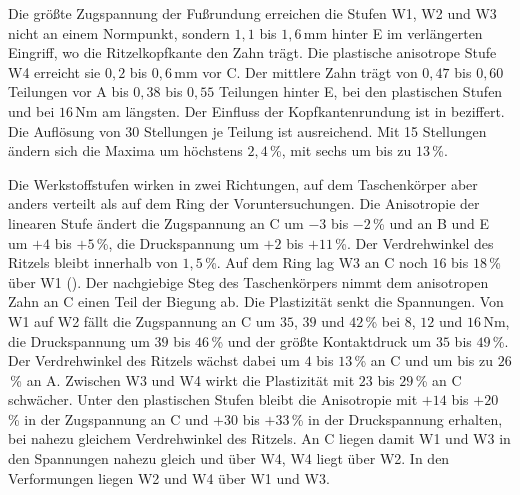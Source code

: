 Die größte Zugspannung der Fußrundung erreichen die Stufen W1, W2 und W3 nicht an einem Normpunkt, sondern $1{,}1$ bis $1{,}6$\,mm hinter E im verlängerten Eingriff, wo die Ritzelkopfkante den Zahn trägt. Die plastische anisotrope Stufe W4 erreicht sie $0{,}2$ bis $0{,}6$\,mm vor C. Der mittlere Zahn trägt von $0{,}47$ bis $0{,}60$ Teilungen vor A bis $0{,}38$ bis $0{,}55$ Teilungen hinter E, bei den plastischen Stufen und bei $16$\,Nm am längsten. Der Einfluss der Kopfkantenrundung ist in  beziffert. Die Auflösung von 30 Stellungen je Teilung ist ausreichend. Mit 15 Stellungen ändern sich die Maxima um höchstens $2{,}4$\,\%, mit sechs um bis zu $13$\,\%.

Die Werkstoffstufen wirken in zwei Richtungen, auf dem Taschenkörper aber anders verteilt als auf dem Ring der Voruntersuchungen. Die Anisotropie der linearen Stufe ändert die Zugspannung an C um $-3$ bis $-2$\,\% und an B und E um $+4$ bis $+5$\,\%, die Druckspannung um $+2$ bis $+11$\,\%. Der Verdrehwinkel des Ritzels bleibt innerhalb von $1{,}5$\,\%. Auf dem Ring lag W3 an C noch $16$ bis $18$\,\% über W1 (). Der nachgiebige Steg des Taschenkörpers nimmt dem anisotropen Zahn an C einen Teil der Biegung ab. Die Plastizität senkt die Spannungen. Von W1 auf W2 fällt die Zugspannung an C um $35$, $39$ und $42$\,\% bei $8$, $12$ und $16$\,Nm, die Druckspannung um $39$ bis $46$\,\% und der größte Kontaktdruck um $35$ bis $49$\,\%. Der Verdrehwinkel des Ritzels wächst dabei um $4$ bis $13$\,\% an C und um bis zu $26$\,\% an A. Zwischen W3 und W4 wirkt die Plastizität mit $23$ bis $29$\,\% an C schwächer. Unter den plastischen Stufen bleibt die Anisotropie mit $+14$ bis $+20$\,\% in der Zugspannung an C und $+30$ bis $+33$\,\% in der Druckspannung erhalten, bei nahezu gleichem Verdrehwinkel des Ritzels. An C liegen damit W1 und W3 in den Spannungen nahezu gleich und über W4, W4 liegt über W2. In den Verformungen liegen W2 und W4 über W1 und W3.

